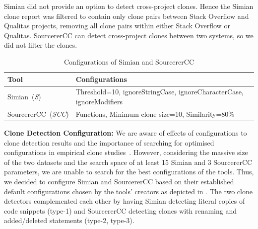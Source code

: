 \documentclass[10pt,journal,compsoc]{IEEEtran}
\begin{document}
Simian did not provide an option to detect cross-project clones. Hence the
Simian clone report was filtered to contain only clone pairs between Stack
Overflow and Qualitas projects, removing all clone pairs within either Stack
Overflow or Qualitas. 
SourcererCC can detect cross-project clones between two systems, so we did
not filter the clones.

\begin{table}
	\centering
	\caption{Configurations of Simian and SourcererCC}
	\label{tab:clone_config}
	\begin{tabular}{lp{5cm}}
		\toprule
		Tool & Configurations \\
		\midrule
		Simian~(\textit{S}) &  Threshold=10, ignoreStringCase, \newline ignoreCharacterCase, \newline ignoreModifiers \\ 
		\midrule
		SourcererCC~(\textit{SCC}) & Functions, Minimum clone size=10, \newline Similarity=80\% \\
		\bottomrule
	\end{tabular}
\end{table}

\textbf{Clone Detection Configuration: } We are aware of effects of
configurations to clone detection results and the importance of searching for
optimised configurations in empirical clone
studies~\cite{Svajlenko2014,Wang2014,cr2016ssbse,Ragkhitwetsagul2016, emse}. However,
considering the massive size of the two datasets and the search space of at
least 15 Simian and 3 SourcererCC parameters, we are unable to search for the
best configurations of the tools. Thus, we decided to configure Simian and
SourcererCC based on their established default configurations chosen by the
tools' creators as depicted in . 
The two clone detectors complemented each
other by having Simian detecting literal copies of code snippets (type-1) and SourcererCC
detecting clones with renaming and added/deleted statements (type-2, type-3). 
\end{document}
